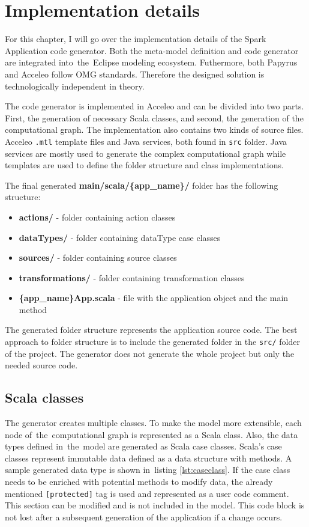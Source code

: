 \chapter{Implementation details}
\label{chap:impl}
For this chapter, I will go over the implementation details of the Spark Application code generator. Both the meta-model definition and code generator are integrated into~the~Eclipse modeling ecosystem. Futhermore, both Papyrus and Acceleo follow OMG standards. Therefore the designed solution is technologically independent in theory. 

The code generator is implemented in Acceleo and can be divided into two parts. First, the generation of necessary Scala classes, and second, the generation of the computational graph. The implementation also contains two kinds of source files. Acceleo \texttt{.mtl} template files and Java services, both found in \texttt{src} folder. Java services are mostly used to generate the complex computational graph while templates are used to define the folder structure and class implementations. 

The final generated \textbf{main/scala/\{app\_name\}/} folder has the following structure: 
\begin{itemize}
    \item \textbf{actions/} - folder containing action classes
    \item \textbf{dataTypes/} - folder containing dataType case classes
    \item \textbf{sources/} - folder containing source classes
    \item \textbf{transformations/} - folder containing transformation classes
    \item \textbf{\{app\_name\}App.scala} - file with the application object and the main method
\end{itemize}

The generated folder structure represents the application source code. The best approach to folder structure is to include the generated folder in the \texttt{src/} folder of the project. The generator does not generate the whole project but only the needed source code.

\section{Scala classes}

The generator creates multiple classes. To make the model more extensible, each node of~the~computational graph is represented as a Scala class. Also, the data types defined in~the~model are generated as Scala case classes. Scala's case classes represent immutable data defined as a data structure with methods. A sample generated data type is shown in~listing \ref{lst:caseclass}. If the case class needs to be enriched with potential methods to modify data, the already mentioned \texttt{[protected]} tag is used and represented as a user code comment. This section can be modified and is not included in the model. This code block is not lost after a subsequent generation of the application if a change occurs. 

